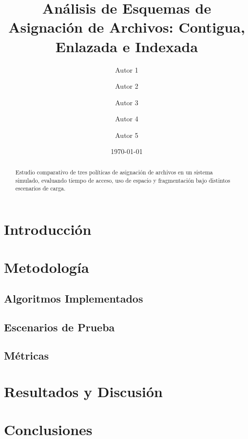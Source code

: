 \documentclass[11pt]{article}
\title{Análisis de Esquemas de Asignación de Archivos: Contigua, Enlazada e Indexada}
\author{Autor 1 \and Autor 2 \and Autor 3 \and Autor 4 \and Autor 5}
\date{\today}
\begin{document}
\maketitle

\begin{abstract}
Estudio comparativo de tres políticas de asignación de archivos en un sistema simulado, evaluando tiempo de acceso, uso de espacio y fragmentación bajo distintos escenarios de carga.
\end{abstract}

\section{Introducción}

\section{Metodología}
\subsection{Algoritmos Implementados}

\subsection{Escenarios de Prueba}

\subsection{Métricas}

\section{Resultados y Discusión}

\section{Conclusiones}



\end{document}
